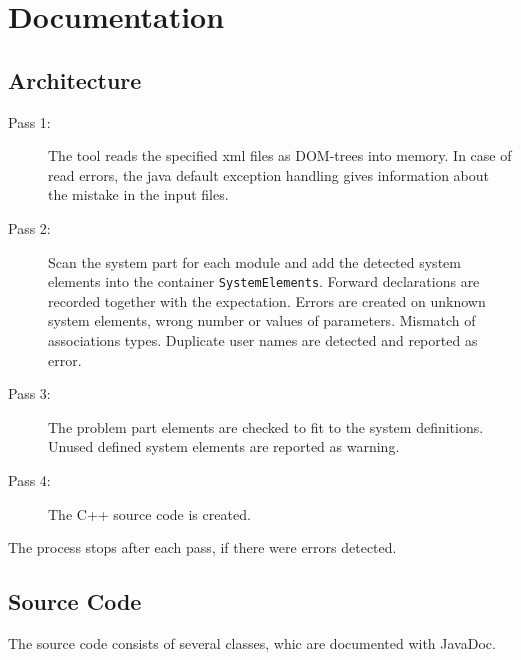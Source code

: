 \chapter{Documentation}

\section{Architecture}

\begin{description}
\item[Pass 1:]
The tool reads the specified xml files as DOM-trees into memory.
In case of read errors, the java default exception handling
gives information about the mistake in the input files.

\item [Pass 2:]
Scan the system part for each module and add the detected system elements
into the container \verb|SystemElements|. Forward declarations are 
recorded together with the expectation. 
Errors are created on unknown system elements, wrong number or values
of parameters. Mismatch of  associations types.
Duplicate user names are detected and reported as error.

\item[Pass 3:]
The problem part elements are checked to fit to the system definitions.
Unused defined system elements are reported as warning.

\item[Pass 4:]
The C++ source code is created.

\end{description}

The process stops after each pass, if there were errors detected.

\section{Source Code}
The source code consists of several classes, whic are documented with JavaDoc.

